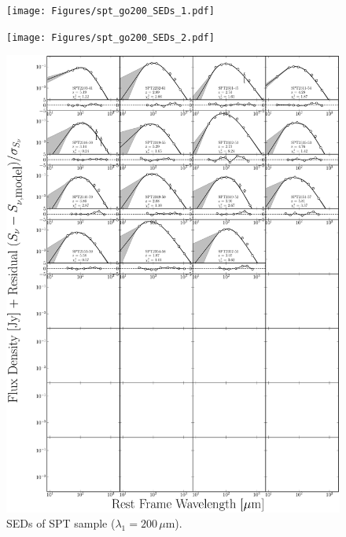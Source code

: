 \begin{figure}
	\centering
	\texttt{[image: Figures/spt\_go200\_SEDs\_1.pdf]}
\end{figure}
\begin{figure}
	\centering
	\texttt{[image: Figures/spt\_go200\_SEDs\_2.pdf]}
\end{figure}
\begin{figure}
	\centering
	\includegraphics[width=\columnwidth]{Figures/spt_go200_SEDs_3.pdf}
	\caption[SEDs of SPT sample ($\lambda_1 = 200\,\mu$m)]{SEDs of SPT sample ($\lambda_1 = 200\,\mu$m).}
\end{figure}
